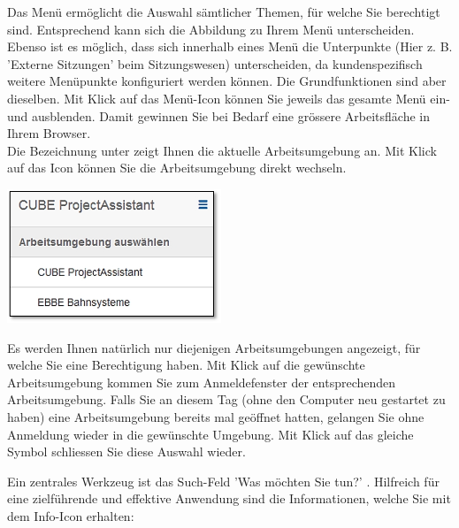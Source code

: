 Das Menü ermöglicht die Auswahl sämtlicher Themen, für welche Sie berechtigt sind. Entsprechend kann sich die Abbildung zu Ihrem Menü unterscheiden. Ebenso ist es möglich, dass sich innerhalb eines Menü die Unterpunkte (Hier z. B. 'Externe Sitzungen' beim Sitzungswesen) unterscheiden, da kundenspezifisch weitere Menüpunkte konfiguriert werden können. Die Grundfunktionen sind aber dieselben. Mit Klick auf das Menü-Icon  können Sie jeweils das gesamte Menü ein- und ausblenden. Damit gewinnen Sie bei Bedarf eine grössere Arbeitsfläche in Ihrem Browser. \\
Die Bezeichnung unter  zeigt Ihnen die aktuelle Arbeitsumgebung an. Mit Klick auf das Icon  können Sie die Arbeitsumgebung direkt wechseln. 

\vspace{\baselineskip}

\begin{raggedleft}
\hspace{80mm} \includegraphics[height=40mm]{../chapters/02_GettingStarted/pictures/2-5-1_Arbeitsumgebung_wechseln.jpg}
\end{raggedleft}

\vspace{\baselineskip}

Es werden Ihnen natürlich nur diejenigen Arbeitsumgebungen angezeigt, für welche Sie eine Berechtigung haben. Mit Klick auf die gewünschte Arbeitsumgebung kommen Sie zum Anmeldefenster der entsprechenden Arbeitsumgebung. Falls Sie an diesem Tag (ohne den Computer neu gestartet zu haben) eine Arbeitsumgebung bereits mal geöffnet hatten, gelangen Sie ohne Anmeldung wieder in die gewünschte Umgebung. Mit Klick auf das gleiche Symbol  schliessen Sie diese Auswahl wieder. 

\vspace{\baselineskip}

Ein zentrales Werkzeug ist das Such-Feld 'Was möchten Sie tun?' . Hilfreich für eine zielführende und effektive Anwendung sind die Informationen, welche Sie mit dem Info-Icon  erhalten:

